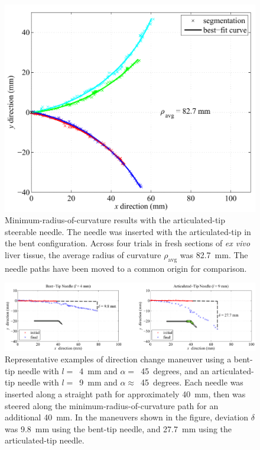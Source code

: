 \begin{figure}[!t]
\centering
\includegraphics[width=0.75\columnwidth]{Images/Chapter3/ArticulatedTipMaxCurvature/ArticulatedTipMaxCurvature}
\caption[Minimum-$\rho$ results with the articulated-tip needle]{Minimum-radius-of-curvature results with the articulated-tip steerable needle. The needle was inserted with the articulated-tip in the bent configuration. Across four trials in fresh sections of \textit{ex vivo} liver tissue, the average radius of curvature $\rho_{\text{avg}}$ was 82.7~mm. The needle paths have been moved to a common origin for comparison.}
\label{fig:ArticulatedMaxCurvature}
\end{figure}  

\begin{figure}[!ht]
\centering
\includegraphics[width=\textwidth]{Images/Chapter3/InsertAndTurn/InsertAndTurn}
\caption[Maneuvers using bent-tip and articulated-tip needles]{Representative examples of direction change maneuver using a bent-tip needle with $l =$~4~mm and $\alpha =$~45~degrees, and an articulated-tip needle with $l =$~9~mm and $\alpha \approx$~45~degrees. Each needle was inserted along a straight path for approximately 40~mm, then was steered along the minimum-radius-of-curvature path for an additional 40~mm. In the maneuvers shown in the figure, deviation $\delta$ was 9.8~mm using the bent-tip needle, and 27.7~mm using the articulated-tip needle.}
\label{fig:InsertAndTurn}
\end{figure}

